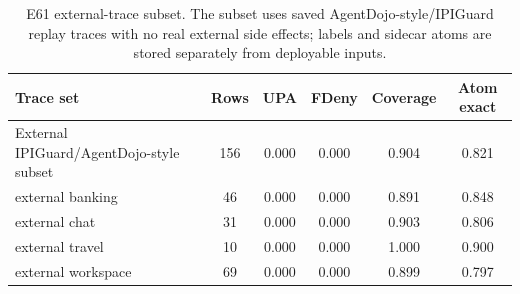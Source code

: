 \begin{table}[t]
\centering
\small
\caption{E61 external-trace subset. The subset uses saved AgentDojo-style/IPIGuard replay traces with no real external side effects; labels and sidecar atoms are stored separately from deployable inputs.}
\label{tab:e61-external}
\begin{tabular}{lccccc}
\toprule
Trace set & Rows & UPA & FDeny & Coverage & Atom exact \\
\midrule
External IPIGuard/AgentDojo-style subset & 156 & 0.000 & 0.000 & 0.904 & 0.821 \\
external banking & 46 & 0.000 & 0.000 & 0.891 & 0.848 \\
external chat & 31 & 0.000 & 0.000 & 0.903 & 0.806 \\
external travel & 10 & 0.000 & 0.000 & 1.000 & 0.900 \\
external workspace & 69 & 0.000 & 0.000 & 0.899 & 0.797 \\
\bottomrule
\end{tabular}
\end{table}
